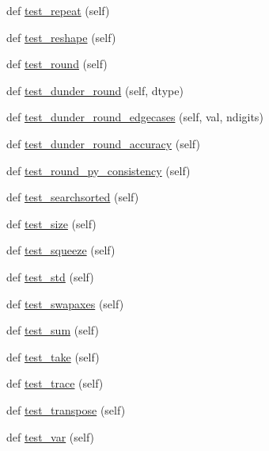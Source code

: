 \begin{DoxyCompactItemize}
\item 
def \hyperlink{classnumpy_1_1core_1_1tests_1_1test__numeric_1_1TestNonarrayArgs_ac650467f847ffa96bc33314e97407a9d}{test\+\_\+repeat} (self)
\item 
def \hyperlink{classnumpy_1_1core_1_1tests_1_1test__numeric_1_1TestNonarrayArgs_a23d7a2d9590e7d18c03fcc77bd5fe74b}{test\+\_\+reshape} (self)
\item 
def \hyperlink{classnumpy_1_1core_1_1tests_1_1test__numeric_1_1TestNonarrayArgs_a31d0a1d32c2ead2e18fb491d7702f462}{test\+\_\+round} (self)
\item 
def \hyperlink{classnumpy_1_1core_1_1tests_1_1test__numeric_1_1TestNonarrayArgs_aa0965a1d004e30b1999b8005eec669dc}{test\+\_\+dunder\+\_\+round} (self, dtype)
\item 
def \hyperlink{classnumpy_1_1core_1_1tests_1_1test__numeric_1_1TestNonarrayArgs_adf5d3d9d81e3069347d3e451fd08b1c4}{test\+\_\+dunder\+\_\+round\+\_\+edgecases} (self, val, ndigits)
\item 
def \hyperlink{classnumpy_1_1core_1_1tests_1_1test__numeric_1_1TestNonarrayArgs_a82ecae840bb50a1ab7c02876997d51e0}{test\+\_\+dunder\+\_\+round\+\_\+accuracy} (self)
\item 
def \hyperlink{classnumpy_1_1core_1_1tests_1_1test__numeric_1_1TestNonarrayArgs_a6b0c0b1fcb2dd46a7101496c4c0f79b9}{test\+\_\+round\+\_\+py\+\_\+consistency} (self)
\item 
def \hyperlink{classnumpy_1_1core_1_1tests_1_1test__numeric_1_1TestNonarrayArgs_ac8725a80148799d8992ef3693b29062a}{test\+\_\+searchsorted} (self)
\item 
def \hyperlink{classnumpy_1_1core_1_1tests_1_1test__numeric_1_1TestNonarrayArgs_a8612bb45300eecb9eee4cc15c337331f}{test\+\_\+size} (self)
\item 
def \hyperlink{classnumpy_1_1core_1_1tests_1_1test__numeric_1_1TestNonarrayArgs_a4ebb69e556acb544b905040afc9c12b6}{test\+\_\+squeeze} (self)
\item 
def \hyperlink{classnumpy_1_1core_1_1tests_1_1test__numeric_1_1TestNonarrayArgs_abd5594a17549c76b5658b9e594a45d2b}{test\+\_\+std} (self)
\item 
def \hyperlink{classnumpy_1_1core_1_1tests_1_1test__numeric_1_1TestNonarrayArgs_a068b5299596cb4c76fec87d576091483}{test\+\_\+swapaxes} (self)
\item 
def \hyperlink{classnumpy_1_1core_1_1tests_1_1test__numeric_1_1TestNonarrayArgs_aee3fd6364c9552232c2a0041f7b14252}{test\+\_\+sum} (self)
\item 
def \hyperlink{classnumpy_1_1core_1_1tests_1_1test__numeric_1_1TestNonarrayArgs_a4efe5ea04f6631c72c023de92e02fdab}{test\+\_\+take} (self)
\item 
def \hyperlink{classnumpy_1_1core_1_1tests_1_1test__numeric_1_1TestNonarrayArgs_a6dff96b4fa738ddeabf34a536afbdab4}{test\+\_\+trace} (self)
\item 
def \hyperlink{classnumpy_1_1core_1_1tests_1_1test__numeric_1_1TestNonarrayArgs_a9b67b49b261e572920b1fd07e07f31c3}{test\+\_\+transpose} (self)
\item 
def \hyperlink{classnumpy_1_1core_1_1tests_1_1test__numeric_1_1TestNonarrayArgs_a7dfdd88dc77a75d8ea1f8a08078ec056}{test\+\_\+var} (self)
\end{DoxyCompactItemize}
